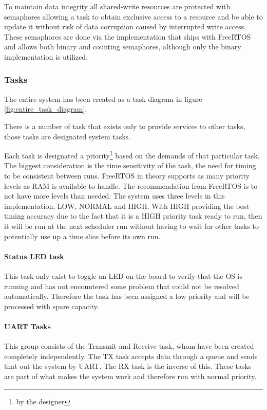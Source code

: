 \documentclass[../../../main]{subfiles}
\begin{document}
To maintain data integrity all shared-write resources are protected with semaphores allowing a task to obtain exclusive access to a resource and be able to update it without risk of data corruption caused by interrupted write access.
These semaphores are done via the implementation that ships with FreeRTOS and allows both binary and counting semaphores, although only the binary implementation is utilized.



\subsubsection{Tasks}

The entire system has been created as a task diagram in figure \ref{fig:entire_task_diagram}.

There is a number of task that exists only to provide services to other tasks, those tasks are designated system tasks.

Each task is designated a priority\footnote{by the designer} based on the demands of that particular task. The biggest consideration is the time sensitivity of the task, the need for timing to be consistent between runs. FreeRTOS in theory supports as many priority levels as RAM is available to handle. The recommendation from FreeRTOS is to not have more levels than needed. The system uses three levels in this implementation, LOW, NORMAL and HIGH. With HIGH providing the best timing accuracy due to the fact that it is a HIGH priority task  ready to run, then it will be run at the next scheduler run without having to wait for other tasks to potentially use up a time slice before its own run.


\paragraph{Status LED task}

This task only exist to toggle an LED on the board to verify that the OS is running and has not encountered some problem that could not be resolved automatically. Therefore the task has been assigned a low priority and will be processed with spare capacity.

\paragraph{UART Tasks}%

This group consists of the Transmit and Receive task, whom have been created completely independently. The TX task accepts data through a queue and sends that out the system by UART. The RX task is the inverse of this. These tasks are part of what makes the system work and therefore run with normal priority.
\end{document}
